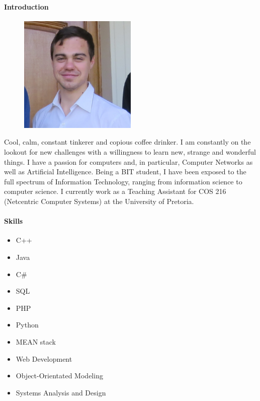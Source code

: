 \documentclass{article}
\begin{document}
        \paragraph{Introduction}
        \begin{figure}
              \begin{center}
                \vspace{-0.75cm}
                \includegraphics[width=0.5\textwidth]{img/justin.jpg}
              \end{center}
            \end{figure}
            Cool, calm, constant tinkerer and copious coffee drinker. I am constantly on the lookout for new challenges with a willingness to learn new, strange and wonderful things. I have a passion for computers and, in particular, Computer Networks as well as Artificial Intelligence. Being a BIT student, I have been exposed to the full spectrum of Information Technology, ranging from information science to computer science. I currently work as a Teaching Assistant for COS 216 (Netcentric Computer Systems) at the University of Pretoria.
            
        \paragraph{Skills}
            \begin{itemize}
                \item C++
                \item Java
                \item C\#
                \item SQL
                \item PHP
                \item Python
                \item MEAN stack
                \item Web Development
                \item Object-Orientated Modeling
                \item Systems Analysis and Design
            \end{itemize}
            
\end{document}
